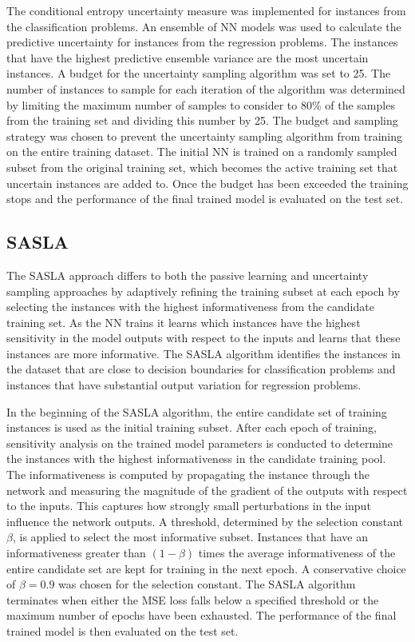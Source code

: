 \documentclass[conference]{IEEEtran}
\begin{document}
	The conditional entropy uncertainty measure was implemented for instances from the classification problems. An ensemble of NN models was used to calculate the predictive uncertainty for instances from the regression problems. The instances that have the highest predictive ensemble variance are the most uncertain instances. A budget for the uncertainty sampling algorithm was set to 25. The number of instances to sample for each iteration of the algorithm was determined by limiting the maximum number of samples to consider to 80\% of the samples from the training set and dividing this number by 25. The budget and sampling strategy was chosen to prevent the uncertainty sampling algorithm from training on the entire training dataset. The initial NN is trained on a randomly sampled subset from the original training set, which becomes the active training set that uncertain instances are added to. Once the budget has been exceeded the training stops and the performance of the final trained model is evaluated on the test set.
	
	\subsection{SASLA}
	The SASLA approach differs to both the passive learning and uncertainty sampling approaches by adaptively refining the training subset at each epoch by selecting the instances with the highest informativeness from the candidate training set. As the NN trains it learns which instances have the highest sensitivity in the model outputs with respect to the inputs and learns that these instances are more informative. The SASLA algorithm identifies the instances in the dataset that are close to decision boundaries for classification problems and instances that have substantial output variation for regression problems.
	
	In the beginning of the SASLA algorithm, the entire candidate set of training instances is used as the initial training subset. After each epoch of training, sensitivity analysis on the trained model parameters is conducted to determine the instances with the highest informativeness in the candidate training pool. The informativeness is computed by propagating the instance through the network and measuring the magnitude of the gradient of the outputs with respect to the inputs. This captures how strongly small perturbations in the input influence the network outputs. A threshold, determined by the selection constant $\beta$, is applied to select the most informative subset. Instances that have an informativeness greater than $(1-\beta)$ times the average informativeness of the entire candidate set are kept for training in the next epoch. A conservative choice of $\beta=0.9$ was chosen for the selection constant. The SASLA algorithm terminates when either the MSE loss falls below a specified threshold or the maximum number of epochs have been exhausted. The performance of the final trained model is then evaluated on the test set.
	
\end{document}
